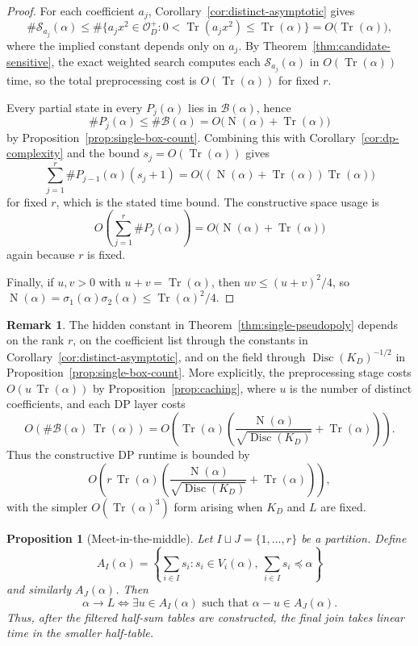 \documentclass[manuscript]{acmart}
\theoremstyle{plain}
\newtheorem{proposition}[theorem]{Proposition}
\theoremstyle{definition}
\theoremstyle{nonitalicremark}
\newtheorem{remark}[theorem]{Remark}
\newcommand{\OO}{\mathcal{O}}
\newcommand{\OD}{\OO_D}
\newcommand{\Tr}{\operatorname{Tr}}
\newcommand{\N}{\operatorname{N}}
\newcommand{\Disc}{\operatorname{Disc}}
\newcommand{\cB}{\mathcal{B}}
\newcommand{\cS}{\mathcal{S}}
\begin{document}
\begin{proof}
For each coefficient $a_j$, Corollary~\ref{cor:distinct-asymptotic} gives
\[
\#\cS_{a_j}(\alpha)
\le
\#\{a_jx^2\in\OD^+ : 0<\Tr(a_jx^2)\le \Tr(\alpha)\}
=
O\bigl(\Tr(\alpha)\bigr),
\]
where the implied constant depends only on $a_j$. By Theorem~\ref{thm:candidate-sensitive}, the
exact weighted search computes each $\cS_{a_j}(\alpha)$ in $O(\Tr(\alpha))$ time, so the total
preprocessing cost is $O(\Tr(\alpha))$ for fixed $r$.

Every partial state in every $P_j(\alpha)$ lies in $\cB(\alpha)$, hence
\[
\#P_j(\alpha)\le \#\cB(\alpha)=O\bigl(\N(\alpha)+\Tr(\alpha)\bigr)
\]
by Proposition~\ref{prop:single-box-count}. Combining this with
Corollary~\ref{cor:dp-complexity} and the bound $s_j=O(\Tr(\alpha))$ gives
\[
\sum_{j=1}^r \#P_{j-1}(\alpha)(s_j+1)
=
O\bigl((\N(\alpha)+\Tr(\alpha))\Tr(\alpha)\bigr)
\]
for fixed $r$, which is the stated time bound. The constructive space usage is
\[
O\!\left(\sum_{j=1}^r \#P_j(\alpha)\right)
=
O\bigl(\N(\alpha)+\Tr(\alpha)\bigr)
\]
again because $r$ is fixed.

Finally, if $u,v>0$ with $u+v=\Tr(\alpha)$, then $uv\le (u+v)^2/4$, so
$\N(\alpha)=\sigma_1(\alpha)\sigma_2(\alpha)\le \Tr(\alpha)^2/4$.
\end{proof}

\begin{remark}
The hidden constant in Theorem~\ref{thm:single-pseudopoly} depends on the rank $r$, on the
coefficient list through the constants in Corollary~\ref{cor:distinct-asymptotic}, and on the field
through $\Disc(K_D)^{-1/2}$ in Proposition~\ref{prop:single-box-count}. More explicitly, the
preprocessing stage costs $O(u\,\Tr(\alpha))$ by Proposition~\ref{prop:caching}, where $u$ is the
number of distinct coefficients, and each DP layer costs
\[
O\!\left(\#\cB(\alpha)\,\Tr(\alpha)\right)
=
O\!\left(\Tr(\alpha)\left(\frac{\N(\alpha)}{\sqrt{\Disc(K_D)}}+\Tr(\alpha)\right)\right).
\]
Thus the constructive DP runtime is bounded by
\[
O\!\left(
r\,\Tr(\alpha)\left(\frac{\N(\alpha)}{\sqrt{\Disc(K_D)}}+\Tr(\alpha)\right)
\right),
\]
with the simpler $O(\Tr(\alpha)^3)$ form arising when $K_D$ and $L$ are fixed.
\end{remark}

\begin{proposition}[Meet-in-the-middle]\label{prop:mitm}
Let $I\sqcup J=\{1,\dots,r\}$ be a partition. Define
\[
A_I(\alpha)=\left\{\sum_{i\in I}s_i : s_i\in V_i(\alpha),\ \sum_{i\in I}s_i\preccurlyeq \alpha\right\}
\]
and similarly $A_J(\alpha)$. Then
\[
\alpha\to L
\iff
\exists u\in A_I(\alpha)\text{ such that }\alpha-u\in A_J(\alpha).
\]
Thus, after the filtered half-sum tables are constructed, the final join takes linear time in the
smaller half-table.
\end{proposition}
\end{document}
